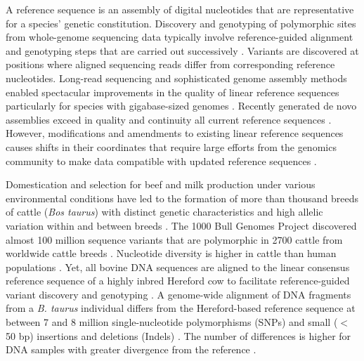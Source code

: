 \documentclass[../main.tex]{subfiles}
\begin{document}
\linespread{1.25} 
\normalsize

A reference sequence is an assembly of digital nucleotides that are representative for a species’ genetic constitution. 
Discovery and genotyping of polymorphic sites from whole-genome sequencing data typically involve reference-guided alignment and genotyping steps that are carried out successively \citep{depristo2011framework}. 
Variants are discovered at positions where aligned sequencing reads differ from corresponding reference nucleotides. Long-read sequencing and sophisticated genome assembly methods enabled spectacular improvements in the quality of linear reference sequences particularly for species with gigabase-sized genomes \citep{koren2018novo}. Recently generated de novo assemblies exceed in quality and continuity all current reference sequences \citep{miga2020telomere,rice2020continuous}. However, modifications and amendments to existing linear reference sequences causes shifts in their coordinates that require large efforts from the genomics community to make data compatible with updated reference sequences \citep{ballouz2019time}.

Domestication and selection for beef and milk production under various environmental conditions have led to the formation of more than thousand breeds of cattle (\emph{Bos taurus}) with distinct genetic characteristics and high allelic variation within and between breeds \citep{scherf2015second}. The 1000 Bull Genomes Project discovered almost 100 million sequence variants that are polymorphic in 2700 cattle from worldwide cattle breeds \citep{daetwyler2014whole,hayes20191000}. Nucleotide diversity is higher in cattle than human populations \citep{daetwyler2014whole,charlier2016ngs}. Yet, all bovine DNA sequences are aligned to the linear consensus reference sequence of a highly inbred Hereford cow to facilitate reference-guided variant discovery and genotyping \citep{worley2012sequencing,elsik2009genome}. A genome-wide alignment of DNA fragments from a \emph{B. taurus} individual differs from the Hereford-based reference sequence at between 7 and 8 million single-nucleotide polymorphisms (SNPs) and small ($<$ 50 bp) insertions and deletions (Indels) \citep{crysnanto2019accurate,jansen2013assessment}. The number of differences is higher for DNA samples with greater divergence from the reference \citep{kim2017genome,koufariotis2018sequencing}.
\end{document}
